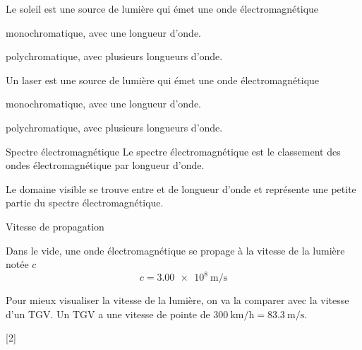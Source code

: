 \begin{qcm}{
  Le soleil est une source de lumière qui émet une onde électromagnétique
}
  \item monochromatique, avec une longueur d'onde.
  \item \reponseQCM polychromatique, avec plusieurs longueurs d'onde.
\end{qcm}

\begin{qcm}{
  Un laser est une source de lumière qui émet une onde électromagnétique
}
  \item \reponseQCM monochromatique, avec une longueur d'onde.
  \item polychromatique, avec plusieurs longueurs d'onde.
\end{qcm}


\begin{doc}{Spectre électromagnétique}
  Le spectre électromagnétique est le classement des ondes électromagnétique par longueur d'onde. 
  \begin{center}
  \end{center}
  Le domaine visible se trouve entre  et  de longueur d'onde et représente une petite partie du spectre électromagnétique.
\end{doc}



\begin{doc}{Vitesse de propagation}
  \begin{importants}
    Dans le vide, une onde électromagnétique se propage à la vitesse de la lumière notée $c$
    \begin{equation*}
      c = \qty{3,00e8}{\m\per\s}
    \end{equation*}
  \end{importants}
\end{doc}

Pour mieux visualiser la vitesse de la lumière, on va la comparer avec la vitesse d'un TGV.
Un TGV a une vitesse de pointe de $\qty{300}{\km\per\hour} = \qty{83,3}{\m\per\s}$.
  
[2]

